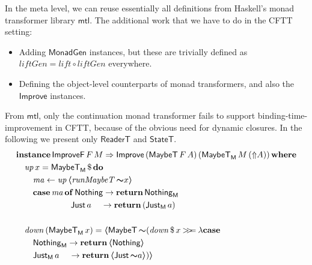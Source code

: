\documentclass[acmsmall,screen,review,anonymous]{acmart}
\newcommand{\mit}[1]{\mathit{#1}}
\newcommand{\msf}[1]{\mathsf{#1}}
\newcommand{\mbf}[1]{\mathbf{#1}}
\newcommand{\bs}[1]{\boldsymbol{#1}}
\newcommand{\mdo}{\mbf{do}\,}
\newcommand{\ind}{\hspace{1em}}
\newcommand{\return}{\mbf{return}\,}
\newcommand{\where}{\mbf{where}}
\newcommand{\M}{\msf{M}}
\newcommand{\of}{\mbf{of}\,}
\newcommand{\vma}{\mit{ma}}
\newcommand{\ReaderT}{\msf{ReaderT}}
\newcommand{\fro}{\leftarrow}
\newcommand{\case}{\mbf{case\,}}
\newcommand{\Up}{{\Uparrow}}
\newcommand{\spl}{{\bs{\sim}}}
\newcommand{\ql}{{\bs{\langle}}}
\newcommand{\qr}{{\bs{\rangle}}}
\newcommand{\bind}{\mathbin{>\!\!>\mkern-6.7mu=}}
\newcommand{\MaybeT}{\msf{MaybeT}}
\newcommand{\Nothing}{\msf{Nothing}}
\newcommand{\Just}{\msf{Just}}
\theoremstyle{remark}
\newcommand{\mup}{\mit{up}}
\newcommand{\mdown}{\mit{down}}
\newcommand{\instance}{\mbf{instance}\,}
\newcommand{\Improve}{\msf{Improve}}
\newcommand{\qt}[1]{\ql#1\qr}
\newcommand{\lift}{\mit{lift}}
\newcommand{\liftGen}{\mit{liftGen}}
\newcommand{\MonadGen}{\msf{MonadGen}}
\newcommand{\RA}{\Rightarrow}
\newcommand{\StateT}{\msf{StateT}}
\newcommand{\runMaybeT}{\mit{runMaybeT}}
\newcommand{\dlr}{\,\$\,}
\newcommand{\ImproveF}{\msf{ImproveF}}
\begin{document}
In the meta level, we can reuse essentially all definitions from Haskell's
monad transformer library $\msf{mtl}$. The additional work that we have to do in
the CFTT setting:
\begin{itemize}
  \item Adding $\MonadGen$ instances, but these are trivially defined as
        $\liftGen = \lift \circ \liftGen$ everywhere.
  \item Defining the object-level counterparts of monad transformers, and
        also the $\Improve$ instances.
\end{itemize}
From $\msf{mtl}$, only the continuation monad transformer fails to support
binding-time-improvement in CFTT, because of the obvious need for dynamic
closures. In the following we present only $\ReaderT$ and $\StateT$.
\begin{alignat*}{3}
  &\instance \ImproveF\,F\,M \RA \Improve\,(\MaybeT\,F\,A)\,(\MaybeT_\M\,M\,(\Up A))\,\where\\
  &\ind \mup\,x = \MaybeT_\M \dlr \mdo\\
  &\ind\ind \vma \fro \mup\,\qt{\runMaybeT\,\spl x}\\
  &\ind\ind \case \vma\,\of \Nothing \to \return \Nothing_\M\\
  &\hspace{6.5em}         \Just\,a \hspace{1.15em}\to \return (\Just_\M\,a)\\
  &\\
  &\ind \mdown\,(\MaybeT_\M\,x) = \qt{\MaybeT\,\spl(\mdown \dlr x \bind \lambda\case\\
  &\ind\ind\Nothing_\M \to \return \qt{\Nothing}\\
  &\ind\ind\Just_\M\,a\hspace{1.15em} \to \return \qt{\Just\,\spl a})}
\end{alignat*}







\end{document}
